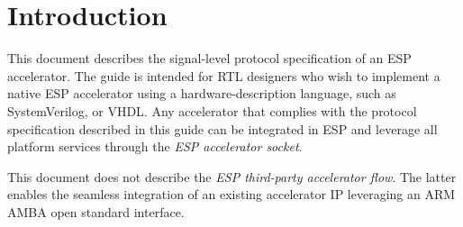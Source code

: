 \chapter{Introduction}

This document describes the signal-level protocol specification of an ESP
accelerator. The guide is intended for RTL designers who wish to implement a
native ESP accelerator using a hardware-description language, such as
SystemVerilog, or VHDL. Any accelerator that complies with the protocol
specification described in this guide can be integrated in ESP and leverage all
platform services through the {\em ESP accelerator socket}.

This document does not describe the {\em ESP third-party accelerator flow}. The
latter enables the seamless integration of an existing accelerator IP leveraging
an ARM AMBA open standard interface.

\newpage



\newpage
